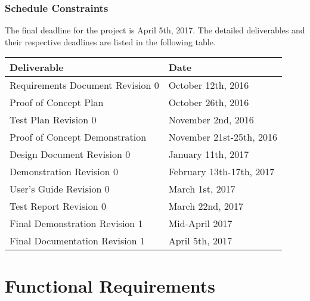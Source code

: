 \documentclass{article}
\begin{document}
\subsubsection{Schedule Constraints}
The final deadline for the project is April 5th, 2017. The detailed deliverables and their respective deadlines are listed in the following table.\\
\begingroup
\begin{centering}
\begin{tabular}{| p{6cm} | p{6cm} |}
    \hline
    \textbf{Deliverable} & \textbf{Date} \\
    \hline
    Requirements Document Revision 0 & October 12th, 2016 \\
    \hline
    Proof of Concept Plan & October 26th, 2016 \\
    \hline
    Test Plan Revision 0 & November 2nd, 2016 \\
    \hline
    Proof of Concept Demonstration & November 21st-25th, 2016 \\
    \hline
    Design Document Revision 0 & January 11th, 2017 \\
    \hline
    Demonstration Revision 0 & February 13th-17th, 2017 \\
    \hline
    User’s Guide Revision 0 & March 1st, 2017 \\
    \hline
    Test Report Revision 0 & March 22nd, 2017 \\
    \hline
    Final Demonstration Revision 1 & Mid-April 2017 \\ 
    \hline
    Final Documentation Revision 1 & April 5th, 2017 \\
    \hline

\end{tabular}
\end{centering}
\endgroup


\newpage
\section{Functional Requirements}
\end{document}

